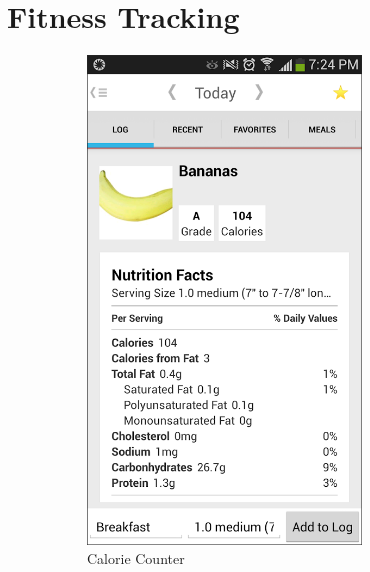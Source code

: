  
\section{Fitness Tracking}
\label{Sec:FitnessTracking}
\begin{figure}
\centering
\begin{subfigure}[b]{0.4\textwidth}
\includegraphics[width=0.8\textwidth]{images/CCScreenshot.PNG}
\caption{Calorie Counter}
\label{fig:CCScreenshot}
\end{subfigure}
\qquad
\begin{subfigure}[b]{0.4\textwidth}

\end{subfigure}
\end{figure}
